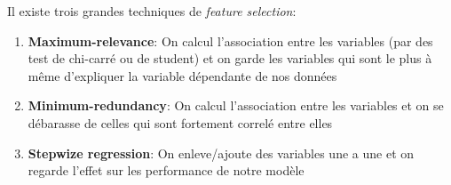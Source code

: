 \documentclass[a4paper, 11pt, onecolumn]{article}
\begin{document}
\begin{enumerate}
Il existe trois grandes techniques de \textit{feature selection}:
\begin{enumerate}
\item \textbf{Maximum-relevance}: On calcul l'association entre les variables (par des test de chi-carré ou de student) et on garde les variables qui sont le plus à même d'expliquer la variable dépendante de nos données
\item \textbf{Minimum-redundancy}: On calcul l'association entre les variables et on se débarasse de celles qui sont fortement correlé entre elles
\item \textbf{Stepwize regression}: On enleve/ajoute des variables une a une et on regarde l'effet sur les performance de notre modèle
\end{enumerate}


\end{enumerate}
\end{document}
